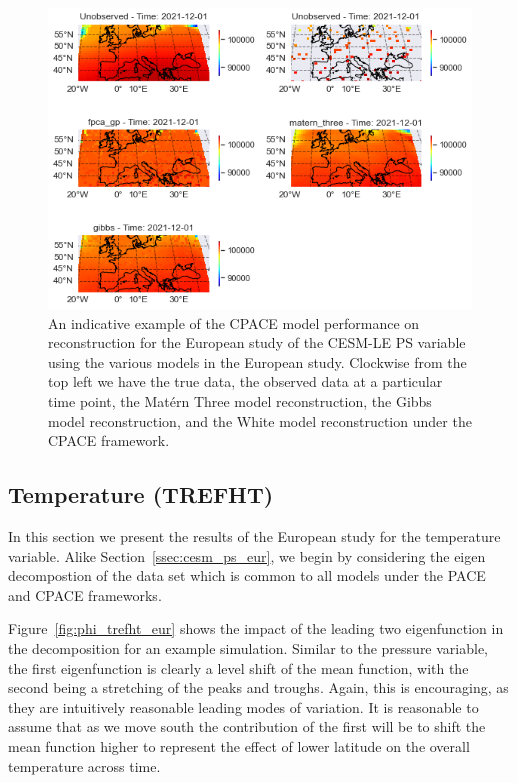 \begin{figure}
	\centering
	\includegraphics[width=\textwidth]{full_ex_ps_eur}
	\caption[An indicative example of the CPACE model performance on reconstruction for the European study of the CESM-LE PS variable using the various models in the European study.]{An indicative example of the CPACE model performance on reconstruction for the European study of the CESM-LE PS variable using the various models in the European study. Clockwise from the top left we have the true data, the observed data at a particular time point, the Mat\'ern Three model reconstruction, the Gibbs model reconstruction, and the White model reconstruction under the CPACE framework.}
	\label{fig:full_ex_ps_eur}
\end{figure}

\subsection{Temperature (TREFHT) \label{ssec:cesm_trefht_eur}}
In this section we present the results of the European study for the temperature variable. 
Alike Section~\ref{ssec:cesm_ps_eur}, we begin by considering the eigen decompostion of the data set which is common to all models under the PACE and CPACE frameworks. 

Figure~\ref{fig:phi_trefht_eur} shows the impact of the leading two eigenfunction in the decomposition for an example simulation. 
Similar to the pressure variable, the first eigenfunction is clearly a level shift of the mean function, with the second being a stretching of the peaks and troughs.
Again, this is encouraging, as they are intuitively reasonable leading modes of variation. 
It is reasonable to assume that as we move south the contribution of the first will be to shift the mean function higher to represent the effect of lower latitude on the overall temperature across time.

